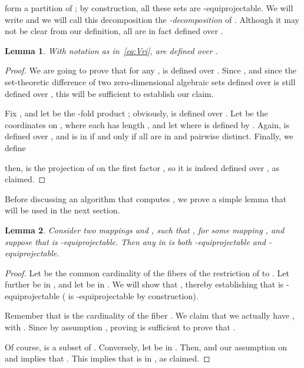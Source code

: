 \documentclass[12pt]{article}
\newtheorem{Lemma}{Lemma}
\begin{document}
form a partition of ; by construction, all these sets are
-equiprojectable. We will write
 and we will call this
decomposition the {\em -decomposition} of .  Although it may
not be clear from our definition, all  are in fact defined
over .

\begin{Lemma}\label{lemma:def}
  With notation as in~\eqref{eq:Vri},  are
  defined over .
\end{Lemma}
\begin{proof}
  We are going to prove that for any ,
   is defined over
  .  Since , and since
  the set-theoretic difference of two zero-dimensional algebraic sets
  defined over  is still defined over , this will be
  sufficient to establish our claim.

  Fix , and let  be the -fold product ; obviously,  is defined
  over . Let  be the coordinates on
  , where each  has length , and let
   where
   is defined by . Again,  is
  defined over , and  is in  if and
  only if all  are in  and pairwise distinct. Finally, we
  define
  
  then,  is the projection of  on the first
  factor , so it is indeed defined over , as claimed.
\end{proof}

Before discussing an algorithm that computes , we prove
a simple lemma that will be used in the next section.
\begin{Lemma}\label{lemma:comp}
  Consider two mappings  and , such that , for some mapping , and suppose that  is
  -equiprojectable. Then any  in  is both
  -equiprojectable and -equiprojectable.
\end{Lemma}
\begin{proof} Let  be the common cardinality of the fibers of the
  restriction of  to . Let further  be in ,
  and let  be in . We will show that ,
  thereby establishing that  is -equiprojectable ( is
  -equiprojectable by construction).
  
  Remember that  is the cardinality of the fiber
  . We claim that we actually
  have , with . Since by
  assumption , proving  is sufficient to prove that
  .

  Of course,  is a subset of . Conversely, let  be in .
  Then,  and our assumption on  and 
  implies that . This implies that  is in
  , as claimed.
\end{proof}
\end{document}

